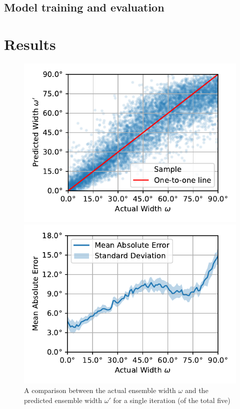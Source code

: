 \documentclass{article}
\begin{document}
\subsection{Model training and evaluation}
\label{subsec:training_evaluation}

\section{Results}
\label{sec:results}


\begin{figure}[ht]
  \centering
  \begin{minipage}[t]{0.45\linewidth}
    \includegraphics[width=\linewidth]{../figures/actual_vs_predicted_width.pdf}
    \caption{\label{fig:actual_vs_predicted_width}A comparison between the actual ensemble width $\omega$ and the predicted ensemble width $\omega'$ for a single iteration (of the total five) }
  \end{minipage}
  \hspace{0.5cm}
  \begin{minipage}[t]{0.45\linewidth}
    \includegraphics[width=\linewidth]{../figures/mae_width.pdf}

\end{minipage}
\end{figure}
\end{document}
